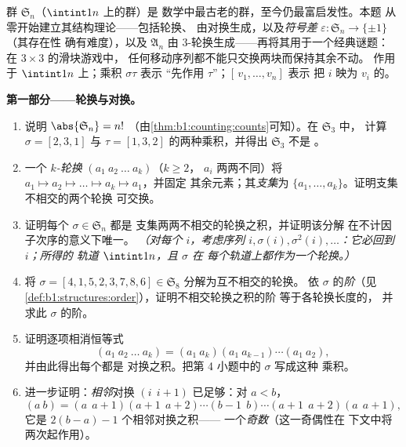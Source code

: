 \begin{problem}\label{pb:b1:structures:1}
群 $\mathfrak S_n$（$\intint1n$ 上的群）是
数学中最古老的群，至今仍最富启发性。本题
从零开始建立其结构理论——包括轮换、
由对换生成，以及\emph{符号差}
$\varepsilon \colon \mathfrak S_n \to \{\pm1\}$（其存在性
确有难度），以及 $\mathfrak A_n$
由 $3$-轮换生成——再将其用于一个经典谜题：
在 $3 \times 3$ 的滑块游戏中，
任何移动序列都不能只交换两块而保持其余不动。
作用于 $\intint1n$ 上；乘积 $\sigma\tau$ 表示
“先作用 $\tau$”；$[\,v_1, \dots, v_n]$ 表示
把 $i$ 映为 $v_i$ 的。

\medskip
\noindent\textbf{第一部分——轮换与对换。}
\begin{enumerate}
  \item 说明 $\abs{\mathfrak S_n} = n!$
        （由\cref{thm:b1:counting:counts}可知）。在 $\mathfrak S_3$ 中，
        计算 $\sigma = [2, 3, 1]$ 与 $\tau =
        [1, 3, 2]$ 的两种乘积，并得出 $\mathfrak S_3$ 不是
        。
  \item 一个 \emph{$k$-轮换} $(a_1\ a_2\ \dots\ a_k)$（$k \geq 2$，
        $a_i$ 两两不同）将 $a_1 \mapsto a_2
        \mapsto \dots \mapsto a_k \mapsto a_1$，并固定
        其余元素；其\emph{支集}为 $\{a_1, \dots,
        a_k\}$。证明支集不相交的两个轮换
        可交换。
  \item 证明每个 $\sigma \in \mathfrak S_n$ 都是
        支集两两不相交的轮换之积，并证明该分解
        在不计因子次序的意义下唯一。
        \emph{（对每个 $i$，考虑序列 $i, \sigma(i),
        \sigma^2(i), \dots$：它必回到 $i$；所得的
        \emph{轨道} $\intint1n$，且 $\sigma$ 在
        每个轨道上都作为一个轮换。）}
  \item 将 $\sigma = [4, 1, 5, 2, 3, 7, 8, 6] \in
        \mathfrak S_8$ 分解为互不相交的轮换。
        依 $\sigma$ 的\emph{阶}（见
        \cref{def:b1:structures:order}），证明不相交轮换之积的阶
        等于各轮换长度的，
        并求此 $\sigma$ 的阶。
  \item 证明逐项相消恒等式
        \[
        (a_1\ a_2\ \dots\ a_k)
        = (a_1\ a_k)(a_1\ a_{k-1})\cdots(a_1\ a_2) ,
        \]
        并由此得出每个都是
        对换之积。把第 4 小题中的 $\sigma$ 写成这种
        乘积。
  \item 进一步证明：\emph{相邻}对换
        $(i\ \ i{+}1)$ 已足够：对 $a < b$，
        \[
        (a\ b) = (a\ \ a{+}1)(a{+}1\ \ a{+}2)\cdots(b{-}1\ \ b)
        \cdots(a{+}1\ \ a{+}2)(a\ \ a{+}1),
        \]
        它是 $2(b - a) - 1$ 个相邻对换之积——
        一个\emph{奇数}（这一奇偶性在
        下文中将两次起作用）。
\end{enumerate}


\end{problem}
